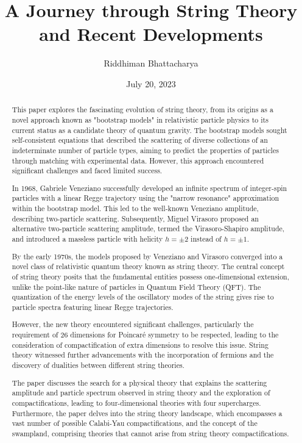 \documentclass[12pt]{article}
\title{\textbf{A Journey through String Theory and Recent Developments}}
\author{Riddhiman Bhattacharya}
\date{July 20, 2023}
\begin{document}
\maketitle

\begin{abstract}
\small
This paper explores the fascinating evolution of string theory, from its origins as a novel approach known as "bootstrap models" in relativistic particle physics to its current status as a candidate theory of quantum gravity. The bootstrap models sought self-consistent equations that described the scattering of diverse collections of an indeterminate number of particle types, aiming to predict the properties of particles through matching with experimental data. However, this approach encountered significant challenges and faced limited success.

In 1968, Gabriele Veneziano successfully developed an infinite spectrum of integer-spin particles with a linear Regge trajectory using the "narrow resonance" approximation within the bootstrap model. This led to the well-known Veneziano amplitude, describing two-particle scattering. Subsequently, Miguel Virasoro proposed an alternative two-particle scattering amplitude, termed the Virasoro-Shapiro amplitude, and introduced a massless particle with helicity $h = \pm 2$ instead of $h = \pm 1$.

By the early 1970s, the models proposed by Veneziano and Virasoro converged into a novel class of relativistic quantum theory known as string theory. The central concept of string theory posits that the fundamental entities possess one-dimensional extension, unlike the point-like nature of particles in Quantum Field Theory (QFT). The quantization of the energy levels of the oscillatory modes of the string gives rise to particle spectra featuring linear Regge trajectories.

However, the new theory encountered significant challenges, particularly the requirement of 26 dimensions for Poincaré symmetry to be respected, leading to the consideration of compactification of extra dimensions to resolve this issue. String theory witnessed further advancements with the incorporation of fermions and the discovery of dualities between different string theories.

The paper discusses the search for a physical theory that explains the scattering amplitude and particle spectrum observed in string theory and the exploration of compactifications, leading to four-dimensional theories with four supercharges. Furthermore, the paper delves into the string theory landscape, which encompasses a vast number of possible Calabi-Yau compactifications, and the concept of the swampland, comprising theories that cannot arise from string theory compactifications.

\end{abstract}
\large
\end{document}
